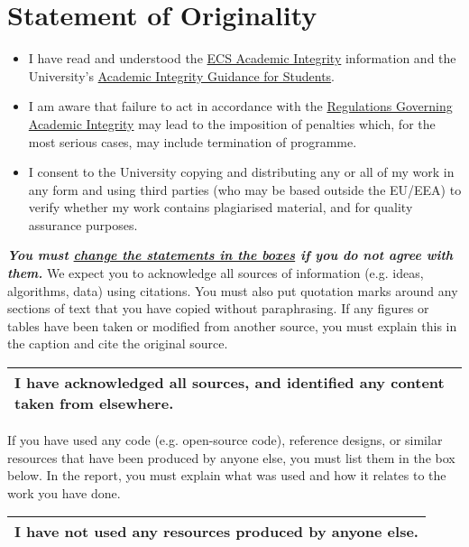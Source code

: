 \section*{Statement of Originality}

\begin{itemize}
  \item I have read and understood the \href{}{ECS Academic Integrity}
        information and the University's \href{}{Academic Integrity
        Guidance for Students}.
  \item I am aware that failure to act in accordance with the \href{}
        {Regulations Governing Academic Integrity} may lead to the
        imposition of penalties which, for the most serious cases, may 
        include termination of programme.
  \item I consent to the University copying and distributing any or all 
        of my work in any form and using third parties (who may be based 
        outside the EU/EEA) to verify whether my work contains plagiarised 
        material, and for quality assurance purposes.
\end{itemize}
\vspace{2mm}
\noindent\textbf{\textit{You must \underline{change the statements in the boxes} if 
you do not agree with them.}}
\x
\noindent We expect you to acknowledge all sources of information (e.g. ideas, algorithms, data) using
citations. You must also put quotation marks around any sections of text that you have copied
without paraphrasing. If any figures or tables have been taken or modified from another source,
you must explain this in the caption and cite the original source.

\begin{longtable}[ht]{ | p{\textwidth} | }
  \hline
  \textbf{ I have acknowledged all sources, and identified any content taken from elsewhere.}
  \\\hline
\end{longtable}

\noindent If you have used any code (e.g. open-source code), reference designs, or similar resources that
have been produced by anyone else, you must list them in the box below. In the report, you must
explain what was used and how it relates to the work you have done.

\begin{longtable}[ht]{ | p{\textwidth} | }
  \hline
  \textbf{I have not used any resources produced by anyone else.
  }
  \\\hline
\end{longtable}

